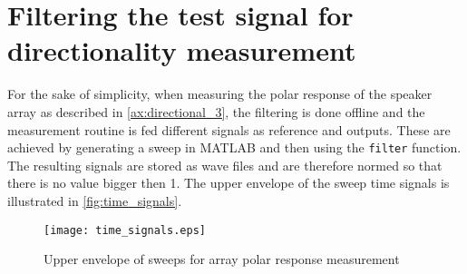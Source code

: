 \section{Filtering the test signal for directionality measurement}\label{sec:signal_filtering}
For the sake of simplicity, when measuring the polar response of the speaker array as described in \autoref{ax:directional_3}, the filtering is done offline and the measurement routine is fed different signals as reference and outputs. These are achieved by generating a sweep in MATLAB and then using the \texttt{filter} function. The resulting signals are stored as wave files and are therefore normed so that there is no value bigger then 1.
The upper envelope of the sweep time signals is illustrated in \autoref{fig:time_signals}.
\begin{figure}[H]
	\centering
	\texttt{[image: time\_signals.eps]}
	\caption{Upper envelope of sweeps for array polar response measurement}
	\label{fig:time_signals}
\end{figure}